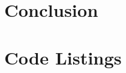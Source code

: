 \documentclass[12pt, openany, a4paper]{book}
\begin{document}
\chapter{Conclusion}



\appendix


\newpage
{}
\mbox{}
\newpage




\chapter{Code Listings}

%



 
\clearpage
\printglossary

\cleardoublepage


\end{document}
